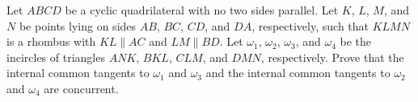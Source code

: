 Let $ABCD$ be a cyclic quadrilateral with no two sides parallel. Let $K$, $L$, $M$, and $N$ be points lying on sides $AB$, $BC$, $CD$, and $DA$, respectively, such that $KLMN$ is a rhombus with $KL \parallel AC$ and $LM \parallel BD$. Let $\omega_1$, $\omega_2$, $\omega_3$, and $\omega_4$ be the incircles of triangles $ANK$, $BKL$, $CLM$, and $DMN$, respectively. Prove that the internal common tangents to $\omega_1$ and $\omega_3$ and the internal common tangents to $\omega_2$ and $\omega_4$ are concurrent.
